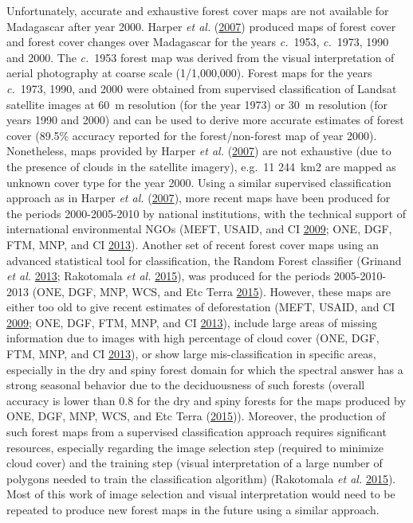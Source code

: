\documentclass[]{article}
\theoremstyle{definition}
\theoremstyle{definition}
\theoremstyle{definition}
\theoremstyle{remark}
\begin{document}
Unfortunately, accurate and exhaustive forest cover maps are not
available for Madagascar after year 2000. Harper \emph{et al.}
(\protect\hyperlink{ref-Harper2007}{2007}) produced maps of forest cover
and forest cover changes over Madagascar for the years \emph{c.}~1953,
\emph{c.}~1973, 1990 and 2000. The \emph{c.}~1953 forest map was derived
from the visual interpretation of aerial photography at coarse scale
(1/1,000,000). Forest maps for the years \emph{c.}~1973, 1990, and 2000
were obtained from supervised classification of Landsat satellite images
at 60~m resolution (for the year 1973) or 30~m resolution (for years
1990 and 2000) and can be used to derive more accurate estimates of
forest cover (89.5\% accuracy reported for the forest/non-forest map of
year 2000). Nonetheless, maps provided by Harper \emph{et al.}
(\protect\hyperlink{ref-Harper2007}{2007}) are not exhaustive (due to
the presence of clouds in the satellite imagery), e.g.~11 244~km2 are
mapped as unknown cover type for the year 2000. Using a similar
supervised classification approach as in Harper \emph{et al.}
(\protect\hyperlink{ref-Harper2007}{2007}), more recent maps have been
produced for the periods 2000-2005-2010 by national institutions, with
the technical support of international environmental NGOs (MEFT, USAID,
and CI \protect\hyperlink{ref-MEFT2009}{2009}; ONE, DGF, FTM, MNP, and
CI \protect\hyperlink{ref-ONE2013}{2013}). Another set of recent forest
cover maps using an advanced statistical tool for classification, the
Random Forest classifier (Grinand \emph{et al.}
\protect\hyperlink{ref-Grinand2013}{2013}; Rakotomala \emph{et al.}
\protect\hyperlink{ref-Rakotomalala2015}{2015}), was produced for the
periods 2005-2010-2013 (ONE, DGF, MNP, WCS, and Etc Terra
\protect\hyperlink{ref-ONE2015}{2015}). However, these maps are either
too old to give recent estimates of deforestation (MEFT, USAID, and CI
\protect\hyperlink{ref-MEFT2009}{2009}; ONE, DGF, FTM, MNP, and CI
\protect\hyperlink{ref-ONE2013}{2013}), include large areas of missing
information due to images with high percentage of cloud cover (ONE, DGF,
FTM, MNP, and CI \protect\hyperlink{ref-ONE2013}{2013}), or show large
mis-classification in specific areas, especially in the dry and spiny
forest domain for which the spectral answer has a strong seasonal
behavior due to the deciduousness of such forests (overall accuracy is
lower than 0.8 for the dry and spiny forests for the maps produced by
ONE, DGF, MNP, WCS, and Etc Terra
(\protect\hyperlink{ref-ONE2015}{2015})). Moreover, the production of
such forest maps from a supervised classification approach requires
significant resources, especially regarding the image selection step
(required to minimize cloud cover) and the training step (visual
interpretation of a large number of polygons needed to train the
classification algorithm) (Rakotomala \emph{et al.}
\protect\hyperlink{ref-Rakotomalala2015}{2015}). Most of this work of
image selection and visual interpretation would need to be repeated to
produce new forest maps in the future using a similar approach.
\end{document}
